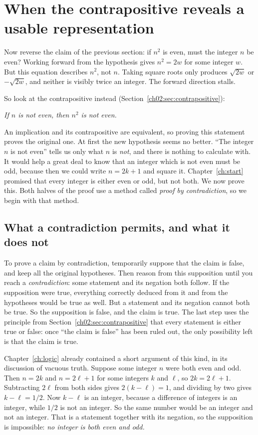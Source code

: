 \section{When the contrapositive reveals a usable representation}\label{ch04:sec:contrapositive}
Now reverse the claim of the previous section: if $n^2$ is even, must the integer $n$ be even? Working forward from the hypothesis gives $n^2=2w$ for some integer $w$. But this equation describes $n^2$, not $n$. Taking square roots only produces $\sqrt{2w}$ or $-\sqrt{2w}$, and neither is visibly twice an integer. The forward direction stalls.

So look at the contrapositive instead (Section~\ref{ch02:sec:contrapositive}):
\begin{center}
\emph{If $n$ is not even, then $n^2$ is not even.}
\end{center}
An implication and its contrapositive are equivalent, so proving this statement proves the original one. At first the new hypothesis seems no better. ``The integer $n$ is not even'' tells us only what $n$ is \emph{not}, and there is nothing to calculate with. It would help a great deal to know that an integer which is not even must be odd, because then we could write $n=2k+1$ and square it. Chapter~\ref{ch:start} promised that every integer is either even or odd, but not both. We now prove this. Both halves of the proof use a method called \emph{proof by contradiction}, so we begin with that method.

\subsection*{What a contradiction permits, and what it does not}
To prove a claim by contradiction, temporarily suppose that the claim is false, and keep all the original hypotheses. Then reason from this supposition until you reach a \emph{contradiction}: some statement and its negation both follow. If the supposition were true, everything correctly deduced from it and from the hypotheses would be true as well. But a statement and its negation cannot both be true. So the supposition is false, and the claim is true. The last step uses the principle from Section~\ref{ch02:sec:contrapositive} that every statement is either true or false: once ``the claim is false'' has been ruled out, the only possibility left is that the claim is true.

Chapter~\ref{ch:logic} already contained a short argument of this kind, in its discussion of vacuous truth. Suppose some integer $n$ were both even and odd. Then $n=2k$ and $n=2\ell+1$ for some integers $k$ and $\ell$, so $2k=2\ell+1$. Subtracting $2\ell$ from both sides gives $2(k-\ell)=1$, and dividing by two gives $k-\ell=1/2$. Now $k-\ell$ is an integer, because a difference of integers is an integer, while $1/2$ is not an integer. So the same number would be an integer and not an integer. That is a statement together with its negation, so the supposition is impossible: \emph{no integer is both even and odd.}

